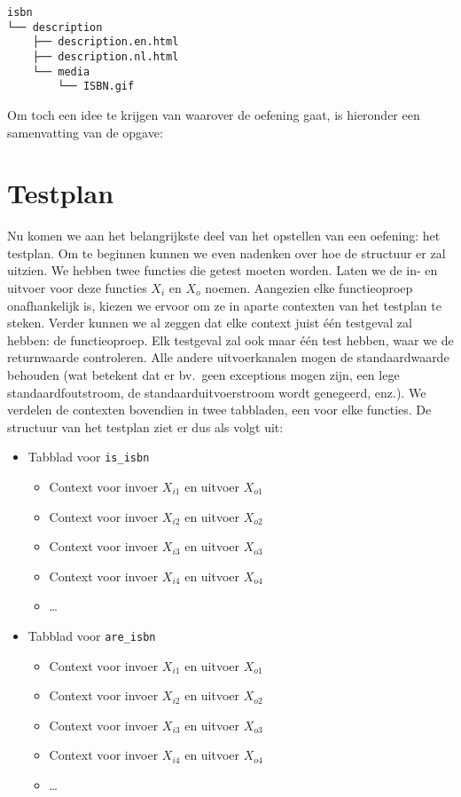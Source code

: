 \begin{verbatim}
isbn
└── description
    ├── description.en.html
    ├── description.nl.html
    └── media
        └── ISBN.gif
\end{verbatim}

Om toch een idee te krijgen van waarover de oefening gaat, is hieronder een samenvatting van de opgave:

\begin{quote}
\end{quote}


\section{Testplan}\label{sec:isbn-testplan}

Nu komen we aan het belangrijkste deel van het opstellen van een oefening: het testplan.
Om te beginnen kunnen we even nadenken over hoe de structuur er zal uitzien.
We hebben twee functies die getest moeten worden.
Laten we de in- en uitvoer voor deze functies $X_i$ en $X_o$ noemen.
Aangezien elke functieoproep onafhankelijk is, kiezen we ervoor om ze in aparte contexten van het testplan te steken.
Verder kunnen we al zeggen dat elke context juist één testgeval zal hebben: de functieoproep.
Elk testgeval zal ook maar één test hebben, waar we de returnwaarde controleren.
Alle andere uitvoerkanalen mogen de standaardwaarde behouden (wat betekent dat er bv.\ geen exceptions mogen zijn, een lege standaardfoutstroom, de standaarduitvoerstroom wordt genegeerd, enz.).
We verdelen de contexten bovendien in twee tabbladen, een voor elke functies.
De structuur van het testplan ziet er dus als volgt uit:

\begin{itemize}
    \item Tabblad voor \texttt{is\_isbn}
           \begin{itemize}
               \item Context voor invoer $X_{i1}$ en uitvoer $X_{o1}$
               \item Context voor invoer $X_{i2}$ en uitvoer $X_{o2}$
               \item Context voor invoer $X_{i3}$ en uitvoer $X_{o3}$
               \item Context voor invoer $X_{i4}$ en uitvoer $X_{o4}$
               \item \ldots
           \end{itemize}
    \item Tabblad voor \texttt{are\_isbn}
    \begin{itemize}
        \item Context voor invoer $X_{i1}$ en uitvoer $X_{o1}$
        \item Context voor invoer $X_{i2}$ en uitvoer $X_{o2}$
        \item Context voor invoer $X_{i3}$ en uitvoer $X_{o3}$
        \item Context voor invoer $X_{i4}$ en uitvoer $X_{o4}$
        \item \ldots
    \end{itemize}
\end{itemize}

